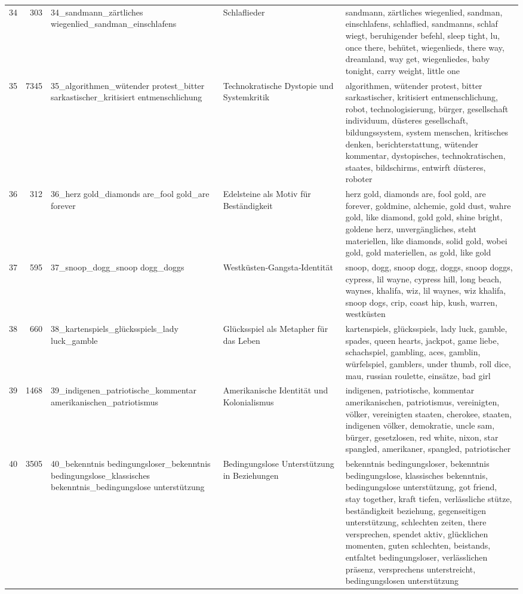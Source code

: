 \begin{longtable}{rrlll}
34 & 303 & 34\_sandmann\_zärtliches wiegenlied\_sandman\_einschlafens & Schlaflieder & sandmann, zärtliches wiegenlied, sandman, einschlafens, schlaflied, sandmanns, schlaf wiegt, beruhigender befehl, sleep tight, lu, once there, behütet, wiegenlieds, there way, dreamland, way get, wiegenliedes, baby tonight, carry weight, little one \\
35 & 7345 & 35\_algorithmen\_wütender protest\_bitter sarkastischer\_kritisiert entmenschlichung & Technokratische Dystopie und Systemkritik & algorithmen, wütender protest, bitter sarkastischer, kritisiert entmenschlichung, robot, technologisierung, bürger, gesellschaft individuum, düsteres gesellschaft, bildungssystem, system menschen, kritisches denken, berichterstattung, wütender kommentar, dystopisches, technokratischen, staates, bildschirms, entwirft düsteres, roboter \\
36 & 312 & 36\_herz gold\_diamonds are\_fool gold\_are forever & Edelsteine als Motiv für Beständigkeit & herz gold, diamonds are, fool gold, are forever, goldmine, alchemie, gold dust, wahre gold, like diamond, gold gold, shine bright, goldene herz, unvergängliches, steht materiellen, like diamonds, solid gold, wobei gold, gold materiellen, as gold, like gold \\
37 & 595 & 37\_snoop\_dogg\_snoop dogg\_doggs & Westküsten‑Gangsta‑Identität & snoop, dogg, snoop dogg, doggs, snoop doggs, cypress, lil wayne, cypress hill, long beach, waynes, khalifa, wiz, lil waynes, wiz khalifa, snoop dogs, crip, coast hip, kush, warren, westküsten \\
38 & 660 & 38\_kartenspiels\_glücksspiels\_lady luck\_gamble & Glücksspiel als Metapher für das Leben & kartenspiels, glücksspiels, lady luck, gamble, spades, queen hearts, jackpot, game liebe, schachspiel, gambling, aces, gamblin, würfelspiel, gamblers, under thumb, roll dice, mau, russian roulette, einsätze, bad girl \\
39 & 1468 & 39\_indigenen\_patriotische\_kommentar amerikanischen\_patriotismus & Amerikanische Identität und Kolonialismus & indigenen, patriotische, kommentar amerikanischen, patriotismus, vereinigten, völker, vereinigten staaten, cherokee, staaten, indigenen völker, demokratie, uncle sam, bürger, gesetzlosen, red white, nixon, star spangled, amerikaner, spangled, patriotischer \\
40 & 3505 & 40\_bekenntnis bedingungsloser\_bekenntnis bedingungslose\_klassisches bekenntnis\_bedingungslose unterstützung & Bedingungslose Unterstützung in Beziehungen & bekenntnis bedingungsloser, bekenntnis bedingungslose, klassisches bekenntnis, bedingungslose unterstützung, got friend, stay together, kraft tiefen, verlässliche stütze, beständigkeit beziehung, gegenseitigen unterstützung, schlechten zeiten, there versprechen, spendet aktiv, glücklichen momenten, guten schlechten, beistands, entfaltet bedingungsloser, verlässlichen präsenz, versprechens unterstreicht, bedingungslosen unterstützung \\

\end{longtable}
